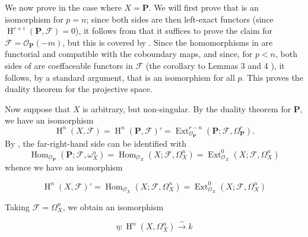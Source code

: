 We now prove  in the case where $X=\mathbf{P}$.
We will first prove that  is an isomorphism for $p=n$;
since both sides are then left-exact functors (since $\operatorname{H}^{r+i}(\mathbf{P},\mathcal{F})=0$), it follows from  that it suffices to prove the claim for $\mathcal{F}=\mathcal{O}_\mathbf{P}(-m)$, but this is covered by .
Since the homomorphisms in  are functorial and compatible with the coboundary maps, and since, for $p<n$, both sides of  are coeffaceable functors in $\mathcal{F}$ (the corollary to Lemmas 3 and 4 ), it follows, by a standard argument, that  is an isomorphism for all $p$.
This proves the duality theorem for the projective space.

Now suppose that $X$ is arbitrary, but non-singular.
By the duality theorem for $\mathbf{P}$, we have an isomorphism
\[
  \operatorname{H}^n(X,\mathcal{F})
  = \operatorname{H}^n(\mathbf{P},\mathcal{F})'
  = \operatorname{Ext}_{\mathcal{O}_\mathbf{P}}^{r-n}(\mathbf{P};\mathcal{F},\Omega_\mathbf{P}^r).
\]
By , the far-right-hand side can be identified with
\[
  \operatorname{Hom}_{\mathcal{O}_\mathbf{P}}(\mathbf{P};\mathcal{F},\omega_X^n)
  = \operatorname{Hom}_{\mathcal{O}_X}(X;\mathcal{F},\Omega_X^n)
  = \operatorname{Ext}_{\mathcal{O}_X}^0(X;\mathcal{F},\Omega_X^n)
\]
whence we have an isomorphism

\begin{equation}\label{fga1-equation-5.6}
  \operatorname{H}^n(X,\mathcal{F})' = \operatorname{Hom}_{\mathcal{O}_X}(X;\mathcal{F},\Omega_X^n) = \operatorname{Ext}_{\mathcal{O}_X}^0(X;\mathcal{F},\Omega_X^n)
\end{equation}

Taking $\mathcal{F}=\Omega_X^n$, we obtain an isomorphism

\begin{equation}\label{fga1-equation-5.7}
  \eta\colon \operatorname{H}^n(X,\Omega_X^n) \xrightarrow{\sim} k
\end{equation}


